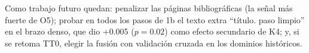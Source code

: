 \documentclass[11pt,a4paper]{article}
\begin{document}
Como trabajo futuro quedan: penalizar las páginas bibliográficas (la señal más fuerte de O5); probar en todos los pasos de 1b el texto extra ``título. paso limpio'' en el brazo denso, que dio +0.005 ($p = 0.02$) como efecto secundario de K4; y, si se retoma TT0, elegir la fusión con validación cruzada en los dominios históricos.



\end{document}
